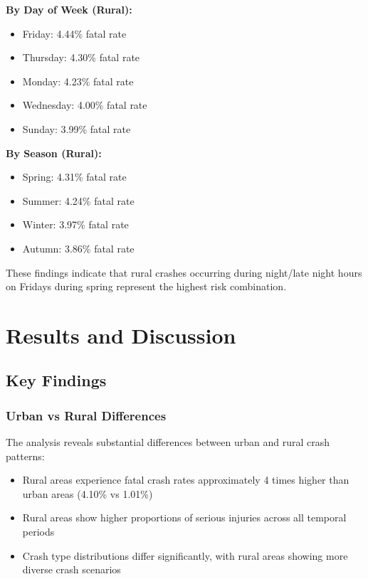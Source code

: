 \documentclass[12pt,a4paper]{article}
\begin{document}
\textbf{By Day of Week (Rural):}
\begin{itemize}
    \item Friday: 4.44\% fatal rate
    \item Thursday: 4.30\% fatal rate
    \item Monday: 4.23\% fatal rate
    \item Wednesday: 4.00\% fatal rate
    \item Sunday: 3.99\% fatal rate
\end{itemize}

\textbf{By Season (Rural):}
\begin{itemize}
    \item Spring: 4.31\% fatal rate
    \item Summer: 4.24\% fatal rate
    \item Winter: 3.97\% fatal rate
    \item Autumn: 3.86\% fatal rate
\end{itemize}

These findings indicate that rural crashes occurring during night/late night hours on Fridays during spring represent the highest risk combination.

\section{Results and Discussion}

\subsection{Key Findings}

\subsubsection{Urban vs Rural Differences}
The analysis reveals substantial differences between urban and rural crash patterns:
\begin{itemize}
    \item Rural areas experience fatal crash rates approximately 4 times higher than urban areas (4.10\% vs 1.01\%)
    \item Rural areas show higher proportions of serious injuries across all temporal periods
    \item Crash type distributions differ significantly, with rural areas showing more diverse crash scenarios
\end{itemize}
\end{document}
